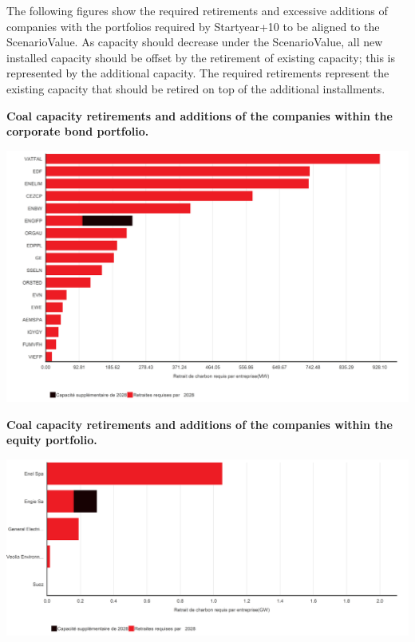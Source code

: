 \documentclass[10pt,table,a4]{article}\usepackage[]{graphicx}\usepackage[]{color}
\begin{document}
	The following figures show the required retirements and excessive additions of companies with the portfolios required by Startyear+10 to be aligned to the ScenarioValue. As capacity should decrease under the ScenarioValue, all new installed capacity should be offset by the retirement of existing capacity; this is represented by the additional capacity. The required retirements represent the existing capacity that should be retired on top of the additional installments.  
	
	\textbf{Coal capacity retirements and additions of the companies within the corporate bond portfolio.}
	\vspace{-.0cm}
	
	\begin{center}
		\includegraphics[trim = {0 0cm 0 0},width=1\linewidth]{ReportOutputs/Fig62}
	\end{center}
	
	\textbf{Coal capacity retirements and additions of the companies within the equity portfolio.}
	\vspace{-.0cm}
	
	\begin{center}
		\includegraphics[trim = {0 0cm 0 0},width=1\linewidth]{ReportOutputs/Fig63}
	\end{center}
\end{document}
